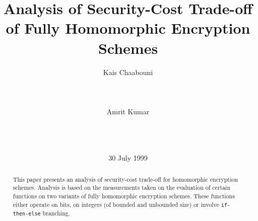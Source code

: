 \documentclass{acm_proc_article-sp}
\begin{document}
\title{Analysis of Security-Cost Trade-off of Fully Homomorphic Encryption Schemes}


%
%
%
%

%
\author{
\alignauthor
Kais Chaabouni \\
       \\
       \\
       \\
\alignauthor 
Amrit Kumar\\
       \\
       \\
       \\
}


\date{30 July 1999}
\maketitle
\begin{abstract}
This paper presents an analysis of security-cost trade-off for homomorphic encryption schemes. Analysis is based on the measurements taken on the evaluation of certain functions on two  variants of fully homomorphic encryption schemes. These functions either operate on bits, on integers (of bounded and unbounded size)  or involve \texttt{if-then-else} branching. 
\end{abstract}
\end{document}
